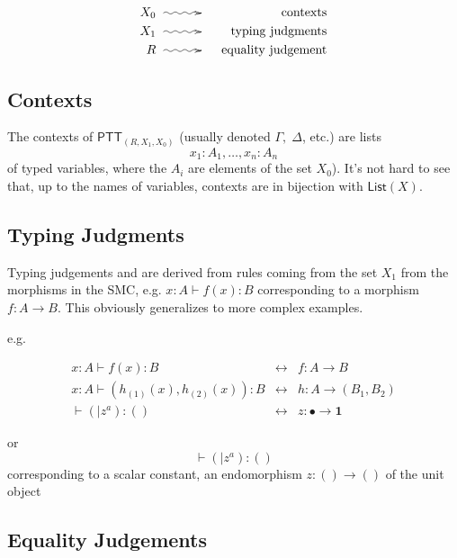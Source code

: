 \documentclass[pra,floatfix,
amsmath,superscriptaddress, 12pt]{article}
\theoremstyle{definition}
\begin{document}
    \begin{eqnarray*}
      X_0 & \xymatrix@C=3em{{}\ar@{~>}[r]&{}} & \mathrm{contexts} \\
      X_1 & \xymatrix@C=3em{{}\ar@{~>}[r]&{}} & \mathrm{typing \ judgments}\\
      R   & \xymatrix@C=3em{{}\ar@{~>}[r]&{}} & \mathrm{equality \ judgement}
    \end{eqnarray*}

\subsection{Contexts}

The contexts of $\mathsf{PTT}_{(R,X_1,X_0)}$ (usually denoted $\Gamma,\;\Delta$, etc.) are lists
    \[
        x_{1}:A_{1},\dots,x_{n}:A_{n}
    \]
of typed variables, where the $A_i$ are elements of the set $X_{0}$). It's not hard to see that, up to the names of variables, contexts are in bijection with $\mathsf{List}(X)$.

\subsection{Typing Judgments}

Typing judgements and are derived from rules coming from the set $X_1$ from the morphisms in the SMC, e.g. $x:A\vdash f\left(x\right):B$ corresponding to a morphism $f:A\longrightarrow B$. This obviously generalizes to more complex examples.

e.g.

\begin{eqnarray*}
    x:A\vdash f\left(x\right):B
        &
        \longleftrightarrow
            & f:A\longrightarrow B \\
    x:A\vdash\left(h_{\left(1\right)}\left(x\right),h_{\left(2\right)}\left(x\right)\right):B
        &
        \longleftrightarrow
            &
            h:A\longrightarrow\left(B_{1},B_{2}\right) \\
    \vdash\left(|z^{a}\right):\left(\right)
        &
        \longleftrightarrow
            &
            z:\bullet \longrightarrow \mathbf{1}
\end{eqnarray*}



or 
\[
\vdash\left(|z^{a}\right):\left(\right)
\]
 corresponding to a scalar constant, an endomorphism $z:\left(\right)\longrightarrow\left(\right)$
of the unit object

\subsection{Equality Judgements}
\end{document}

